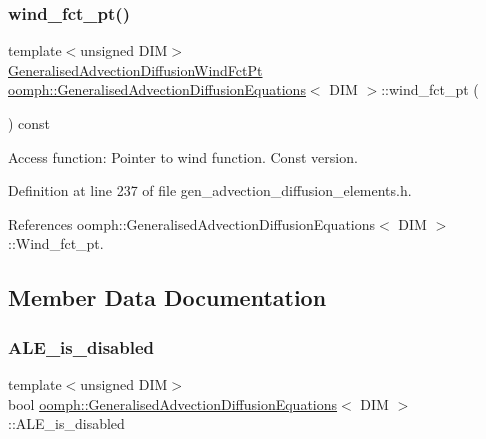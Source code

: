 \subsubsection{\texorpdfstring{wind\+\_\+fct\+\_\+pt()}{wind\_fct\_pt()}\hspace{0.1cm}{\footnotesize\ttfamily [2/2]}}
{\footnotesize\ttfamily template$<$unsigned D\+IM$>$ \\
\hyperlink{classoomph_1_1GeneralisedAdvectionDiffusionEquations_ac5a63eb03aee5957e7b14a4578423cfc}{Generalised\+Advection\+Diffusion\+Wind\+Fct\+Pt} \hyperlink{classoomph_1_1GeneralisedAdvectionDiffusionEquations}{oomph\+::\+Generalised\+Advection\+Diffusion\+Equations}$<$ D\+IM $>$\+::wind\+\_\+fct\+\_\+pt (\begin{DoxyParamCaption}{ }\end{DoxyParamCaption}) const\hspace{0.3cm}{\ttfamily [inline]}}



Access function\+: Pointer to wind function. Const version. 



Definition at line 237 of file gen\+\_\+advection\+\_\+diffusion\+\_\+elements.\+h.



References oomph\+::\+Generalised\+Advection\+Diffusion\+Equations$<$ D\+I\+M $>$\+::\+Wind\+\_\+fct\+\_\+pt.



\subsection{Member Data Documentation}
\mbox{\label{classoomph_1_1GeneralisedAdvectionDiffusionEquations_aa984fe8aeae0f3aedfd8e92c76ce9cd0}} 
\subsubsection{\texorpdfstring{A\+L\+E\+\_\+is\+\_\+disabled}{ALE\_is\_disabled}}
{\footnotesize\ttfamily template$<$unsigned D\+IM$>$ \\
bool \hyperlink{classoomph_1_1GeneralisedAdvectionDiffusionEquations}{oomph\+::\+Generalised\+Advection\+Diffusion\+Equations}$<$ D\+IM $>$\+::A\+L\+E\+\_\+is\+\_\+disabled\hspace{0.3cm}{\ttfamily [protected]}}



